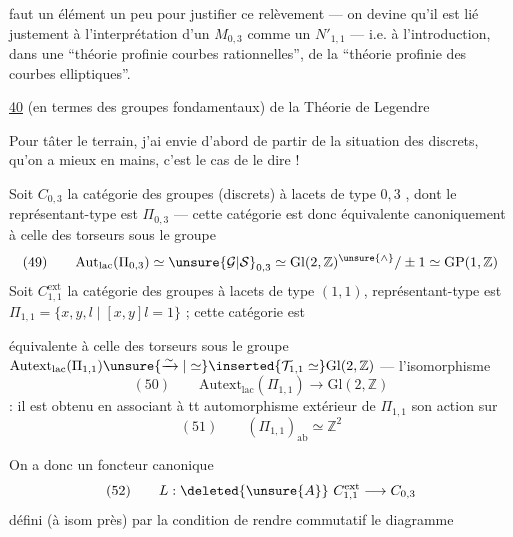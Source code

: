 
faut un élément un peu  pour justifier ce relèvement --- on
devine qu'il est lié justement à l'interprétation d'un $M_{0,3}$ comme
un $N'_{1,1}$ --- i.e. à l'introduction, dans une ``théorie profinie
 courbes rationnelles'', de la ``théorie profinie des
courbes elliptiques''.


\uline{40} 
(en termes des groupes fondamentaux) de la Théorie de Legendre

Pour tâter le terrain, j'ai envie d'abord de partir de la situation des
 discrets, qu'on a mieux en mains, c'est le cas de le dire !

Soit $C_{0,3}$ la catégorie des groupes (discrets) à lacets de type $0,3$
, dont le
représentant-type est $\Pi_{0,3}$ --- cette catégorie est donc
équivalente canoniquement à celle des torseurs sous le groupe
\[
(49)\qquad
\mathrm{Aut}_{\mathrm{lac}}(\Pi_{0,3})
\simeq\unsure{\mathcal G|\mathcal S}_{0,3}
\simeq\mathrm{Gl}(2,\mathbb Z)^{\unsure{\wedge}}/\pm1
\simeq\mathrm{GP}(1,\mathbb Z)
\]
Soit $C_{1,1}^{\mathrm{ext}}$ la catégorie des groupes à lacets
 de type $(1,1)$,
 représentant-type est
$\Pi_{1,1}=\{x,y,l\mid[x,y]l=1\}$ ; cette catégorie est


équivalente à celle des torseurs sous le groupe
$\mathrm{Autext}_{\mathrm{lac}}(\Pi_{1,1})
\unsure{\xrightarrow{\sim}|\simeq}
\inserted{\mathcal T_{1,1}\simeq}\mathrm{Gl}(2,\mathbb Z)$
--- l'isomorphisme
\[
(50)\qquad
\mathrm{Autext}_{\mathrm{lac}}(\Pi_{1,1})\longrightarrow
\mathrm{Gl}(2,\mathbb Z)
\]
: il est obtenu en associant à tt automorphisme extérieur de
$\Pi_{1,1}$ son action sur
\[
(51)\qquad
(\Pi_{1,1})_{\mathrm{ab}}\simeq\mathbb Z^2
\]

On a donc un foncteur canonique
\[
(52)\qquad
L:\deleted{\unsure{A}}\ C_{1,1}^{\mathrm{ext}}
\longrightarrow C_{0,3}
\]
défini (à isom  près) par la condition de rendre commutatif
le diagramme

